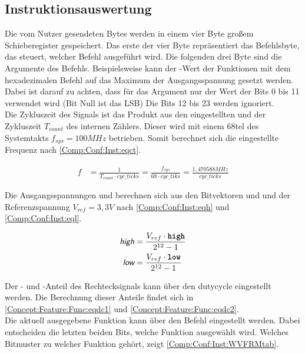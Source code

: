 \subsection{Instruktionsauswertung} \label{Comp:Conf:Inst}
Die vom Nutzer gesendeten Bytes werden in einem vier Byte großem Schieberegister gespeichert.
Das erste der vier Byte repräsentiert das Befehlsbyte, das steuert, welcher Befehl ausgeführt wird.
Die folgenden drei Byte sind die Argumente des Befehls.
Beispielsweise kann der -Wert der Funktionen mit dem hexadezimalen Befehl  auf das Maximum der Ausgangsspannung gesetzt werden.
Dabei ist darauf zu achten, dass für das Argument nur der Wert der Bits 0 bis 11 verwendet wird (Bit Null ist das LSB)
Die Bits 12 bis 23 werden ignoriert. \\
Die Zykluszeit des Signals ist das Produkt aus den eingestellten  und der Zykluszeit $T_{count}$ des internen Zählers.
Dieser wird mit einem 68tel des Systemtakts $f_{sys} = 100MHz$ betrieben.
Somit berechnet sich die eingestellte Frequenz nach \cref{Comp:Conf:Inst:eqct}.

\begin{align}
  f &= \frac{1}{T_{count} \cdot cyc\_ticks} = \frac{f_{sys}}{68 \cdot cyc\_tiks} = \frac{1,470588 MHz}{cyc\_ticks} \label{Comp:Conf:Inst:eqct}
\end{align}

Die Ausgangsspannungen  und  berechnen sich aus den Bitvektoren  und  und der Referenzspannung $V_{ref} = 3,3 V$ nach \cref{Comp:Conf:Inst:eqh} und \cref{Comp:Conf:Inst:eql}.
  
\begin{align}
  \textsf{\itshape{high}} &= \frac{V_{ref} \cdot \textbf{\texttt{high}}}{2^{12} - 1} \label{Comp:Conf:Inst:eqh} \\
  \textsf{\itshape{low}} &= \frac{V_{ref} \cdot \textbf{\texttt{low}}}{2^{12} - 1} \label{Comp:Conf:Inst:eql}
\end{align}

Der - und -Anteil des Rechtecksignals kann über den dutycycle eingestellt werden.
Die Berechnung dieser Anteile findet sich in \cref{Concept:Feature:Func:eqdc1} und \cref{Concept:Feature:Func:eqdc2}.\\
Die aktuell ausgegebene Funktion kann über den Befehl  eingestellt werden.
Dabei entscheiden die letzten beiden Bits, welche Funktion ausgewählt wird.
Welches Bitmuster zu welcher Funktion gehört, zeigt \cref{Comp:Conf:Inst:WVFRMtab}.

